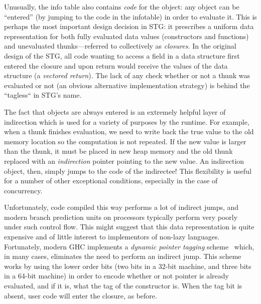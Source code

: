 Unusually, the info table also contains \emph{code} for the object: any
object can be ``entered'' (by jumping to the code in the infotable) in
order to evaluate it.  This is perhaps the most important design
decision in STG: it prescribes a uniform data representation for both
fully evaluated data values (constructors and functions) and unevaluated
thunks---referred to collectively as \emph{closures}.  In the original
design of the STG, all code wanting to access a field in a data
structure first entered the closure and upon return would receive the
values of the data structure (a \emph{vectored return}).  The lack of
any check whether or not a thunk was evaluated or not (an obvious
alternative implementation strategy) is behind the ``tagless`` in STG's
name.



The fact that objects are always entered is an extremely helpful layer
of indirection which is used for a variety of purposes by the runtime.
For example, when a thunk finishes evaluation, we need to write back the
true value to the old memory location so the computation is not
repeated.  If the new value is larger than the thunk, it must be placed
in new heap memory and the old thunk replaced with an \emph{indirection}
pointer pointing to the new value.  An indirection object, then, simply
jumps to the code of the indirectee!  This flexibility is useful for a
number of other exceptional conditions, especially in the case of
concurrency.

Unfortunately, code compiled this way performs a lot of indirect jumps,
and modern branch prediction units on processors typically perform very
poorly under such control flow.  This might suggest that this data
representation is quite expensive and of little interest to implementors
of non-lazy languages.  Fortunately, modern GHC implements a
\emph{dynamic pointer tagging} scheme~\XXX{} which, in many cases,
eliminates the need to perform an indirect jump.  This scheme works by
using the lower order bits (two bits in a 32-bit machine, and three bits
in a 64-bit machine) in order to encode whether or not pointer is
already evaluated, and if it is, what the tag of the constructor is.
When the tag bit is absent, user code will enter the closure, as before.

